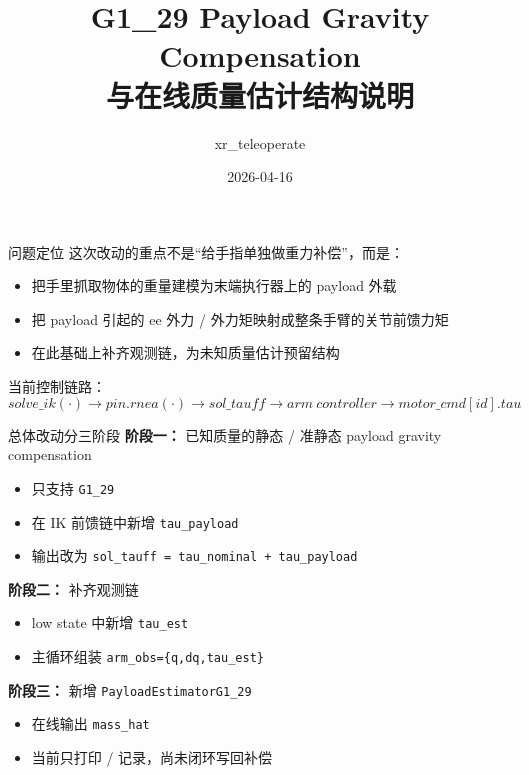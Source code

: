 \documentclass[aspectratio=169,11pt]{ctexbeamer}
\title{G1\_29 Payload Gravity Compensation\\与在线质量估计结构说明}
\author{xr\_teleoperate}
\date{2026-04-16}
\begin{document}
\begin{frame}
  \titlepage
\end{frame}

\begin{frame}{问题定位}
  这次改动的重点不是“给手指单独做重力补偿”，而是：
  \begin{itemize}
    \item 把手里抓取物体的重量建模为末端执行器上的 payload 外载
    \item 把 payload 引起的 ee 外力 / 外力矩映射成整条手臂的关节前馈力矩
    \item 在此基础上补齐观测链，为未知质量估计预留结构
  \end{itemize}

  \vspace{0.4em}
  当前控制链路：
  \[
  solve\_ik(\cdot)\rightarrow pin.rnea(\cdot)\rightarrow sol\_tauff
  \rightarrow arm\ controller \rightarrow motor\_cmd[id].tau
  \]
\end{frame}

\begin{frame}{总体改动分三阶段}
  \textbf{阶段一：} 已知质量的静态 / 准静态 payload gravity compensation
  \begin{itemize}
    \item 只支持 \texttt{G1\_29}
    \item 在 IK 前馈链中新增 \texttt{tau\_payload}
    \item 输出改为 \texttt{sol\_tauff = tau\_nominal + tau\_payload}
  \end{itemize}

  \textbf{阶段二：} 补齐观测链
  \begin{itemize}
    \item low state 中新增 \texttt{tau\_est}
    \item 主循环组装 \texttt{arm\_obs=\{q,dq,tau\_est\}}
  \end{itemize}

  \textbf{阶段三：} 新增 \texttt{PayloadEstimatorG1\_29}
  \begin{itemize}
    \item 在线输出 \texttt{mass\_hat}
    \item 当前只打印 / 记录，尚未闭环写回补偿
  \end{itemize}
\end{frame}
\end{document}

